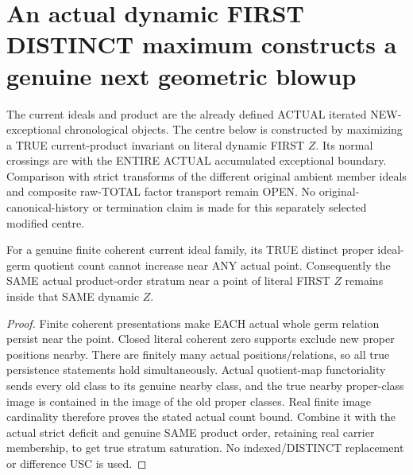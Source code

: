 \section{An actual dynamic FIRST DISTINCT maximum constructs a genuine next geometric blowup}

The current ideals and product are the already defined ACTUAL iterated
NEW-exceptional chronological objects. The centre below is constructed by
maximizing a TRUE current-product invariant on literal dynamic FIRST $Z$.
Its normal crossings are with the ENTIRE ACTUAL accumulated exceptional
boundary. Comparison with strict transforms of the different original
ambient member ideals and composite raw-TOTAL factor transport remain OPEN.
No original-canonical-history or termination claim is made for this
separately selected modified centre.

\begin{lemma}
\label{hir:sharp-actual-current-distinct-count-usc}
\leanok
For a genuine finite coherent current ideal family, its TRUE distinct
proper ideal-germ quotient count cannot increase near ANY actual point.
Consequently the SAME actual product-order stratum near a point of literal
FIRST $Z$ remains inside that SAME dynamic $Z$.
\end{lemma}
\begin{proof}
Finite coherent presentations make EACH actual whole germ relation persist
near the point. Closed literal coherent zero supports exclude new proper
positions nearby. There are finitely many actual positions/relations, so
all true persistence statements hold simultaneously. Actual quotient-map
functoriality sends every old class to its genuine nearby class, and the
true nearby proper-class image is contained in the image of the old proper
classes. Real finite image cardinality therefore proves the stated actual
count bound. Combine it with the actual strict deficit and genuine SAME
product order, retaining real carrier membership, to get true stratum
saturation. No indexed/DISTINCT replacement or difference USC is used.
\end{proof}

